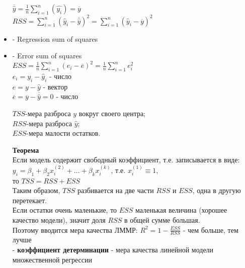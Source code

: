 \documentclass{article}
\begin{document}
\begin{itemize}
$\overline{\hat{y}}=\frac{1}{n}\sum\limits_{i=1}^n(\hat{y_i})=\overline{y}$\\
$RSS=\sum\limits_{i=1}^n(\hat{y}_i-\overline{\hat{y}})^2=\sum\limits_{i=1}^n(\hat{y}_i-\overline{y})^2$ \\
\item {} - Regression sum of squares\\
\item {} - Error sum of squares\\
$ESS=\frac{1}{n}\sum\limits_{i=1}^n(e_i-\overline{e})^2=\frac{1}{n}\sum\limits_{i=1}^ne_i^2$ \\
$e_i=y_i-\hat{y}_i$ - число\\
$e=y-\hat{y}$ - вектор\\
$\overline{e}=\overline{y}-\overline{\hat{y}}=0$ - число

\vspace{2ex}
$TSS$-мера разброса $y$ вокруг своего центра;\\
$RSS$-мера разброса $\hat{y}$;\\
$ESS$-мера малости остатков.

\vspace{2ex}
\textbf{Теорема}\\
Если модель содержит свободный коэффициент, т.е. записывается в виде:\\
$y_i = \beta_1 + \beta_2x_i^{(2)} + ...+\beta_kx_i^{(k)}$, \quad т.е. $x^{(1)}_i \equiv 1$,\\
то $TSS=RSS+ESS$\\

\vspace{1ex}
Таким образом, $TSS$ разбивается на две части $RSS$ и $ESS$, одна в другую перетекает.\\
Если остатки очень маленькие, то $ESS$ маленькая величина (хорошее качество модели), значит доля $RSS$ в общей сумме большая.\\
Поэтому вводится мера качества ЛММР: $R^2=1-\frac{ESS}{RSS}$ - чем больше, тем лучше\\

\vspace{1ex}
 - \textbf{коэффициент детерминации} - мера качества линейной модели множественной регрессии
\vspace{1ex}


\end{itemize}
\end{document}
